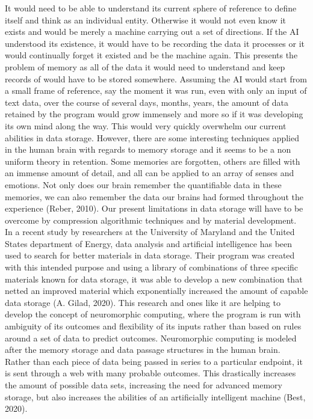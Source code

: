 \documentclass[11pt]{article}
\theoremstyle{plain}
\begin{document}
It would need to be able to understand its current sphere of reference to define itself and think as an individual entity. Otherwise it would not even know it exists and would be merely a machine carrying out a set of directions. If the AI understood its existence, it would have to be recording the data it processes or it would continually forget it existed and be the machine again. This presents the problem of memory as all of the data it would need to understand and keep records of would have to be stored somewhere. Assuming the AI would start from a small frame of reference, say the moment it was run, even with only an input of text data, over the course of several days, months, years, the amount of data retained by the program would grow immensely and more so if it was developing its own mind along the way. This would very quickly overwhelm our current abilities in data storage. However, there are some interesting techniques applied in the human brain with regards to memory storage and it seems to be a non uniform theory in retention. Some memories are forgotten, others are filled with an immense amount of detail, and all can be applied to an array of senses and emotions. Not only does our brain remember the quantifiable data in these memories, we can also remember the data our brains had formed throughout the experience (Reber, 2010). Our present limitations in data storage will have to be overcome by compression algorithmic techniques and by material development. \\

In a recent study by researchers at the University of Maryland and the United States department of Energy, data analysis and artificial intelligence has been used to search for better materials in data storage. Their program was created with this intended purpose and using a library of combinations of three specific materials known for data storage, it was able to develop a new combination that netted an improved material which exponentially increased the amount of capable data storage (A. Gilad, 2020). This research and ones like it are helping to develop the concept of neuromorphic computing, where the program is run with ambiguity of its outcomes and flexibility of its inputs rather than based on rules around a set of data to predict outcomes. Neuromorphic computing is modeled after the memory storage and data passage structures in the human brain. Rather than each piece of data being passed in series to a particular endpoint, it is sent through a web with many probable outcomes. This drastically increases the amount of possible data sets, increasing the need for advanced memory storage, but also increases the abilities of an artificially intelligent machine (Best, 2020).\\
\end{document}
